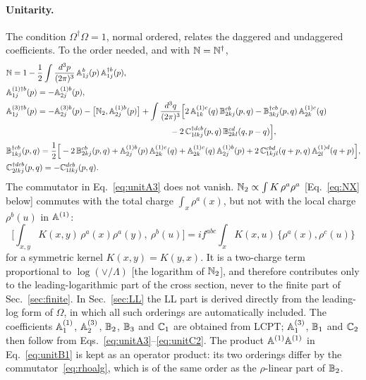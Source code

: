 \paragraph*{Unitarity.} The condition $\Omega^\dagger\Omega=1$, normal ordered, relates the daggered and undaggered coefficients. To the order needed, and with $\mathbb{N}=\mathbb{N}^\dagger$,
\begin{align}
&\mf N=1-\frac12\int\frac{d^3p}{(2\pi)^3}\,\mf A^{b}_{1j}(p)\,\mf A^{\dagger b}_{1j}(p),\label{eq:unitN}\\
&\mf A^{(1)\dagger b}_{1j}(p)=-\mf A^{(1)b}_{2j}(p),\label{eq:unitA1}\\
&\mf A^{(3)\dagger b}_{1j}(p)=-\mf A^{(3)b}_{2j}(p)-\big[\mf N_2,\mf A^{(1)b}_{2j}(p)\big]+\int\frac{d^3q}{(2\pi)^3}\Big[2\,\mf A^{(1)c}_{1k}(q)\,\mf B^{cb}_{2kj}(p,q)-\mf B^{\dagger cb}_{3kj}(p,q)\,\mf A^{(1)c}_{2k}(q)\notag\\
&\hspace{20em}-2\,\mf C^{\dagger dcb}_{1lkj}(p,q)\,\mf B^{cd}_{2kl}(q,p-q)\Big],\label{eq:unitA3}\\
&\mf B^{\dagger cb}_{1kj}(p,q)=\frac12\Big[-2\,\mf B^{cb}_{2kj}(p,q)+\mf A^{(1)b}_{2j}(p)\,\mf A^{(1)c}_{2k}(q)+\mf A^{(1)c}_{2k}(q)\,\mf A^{(1)b}_{2j}(p)+2\,\mf C^{cbd}_{1kjl}(q+p,q)\,\mf A^{(1)d}_{2l}(q+p)\Big],\label{eq:unitB1}\\
&\mf C^{\dagger dcb}_{2lkj}(p,q)=-\mf C^{dcb}_{1lkj}(p,q).\label{eq:unitC2}
\end{align}
The commutator in Eq.~\eqref{eq:unitA3} does not vanish. $\mathbb{N}_2\propto\int K\,\rho^a\rho^a$ [Eq.~\eqref{eq:NX} below] commutes with the total charge $\int_x\rho^a(x)$, but not with the local charge $\rho^b(u)$ in $\mathbb{A}^{(1)}$:
\begin{equation}
\Big[\int_{x,y}K(x,y)\,\rho^a(x)\rho^a(y),\ \rho^b(u)\Big]=if^{abc}\int_xK(x,u)\,\big\{\rho^a(x),\rho^c(u)\big\}
\label{eq:Ncomm}
\end{equation}
for a symmetric kernel $K(x,y)=K(y,x)$. It is a two-charge term proportional to $\log(\vee/\Lambda)$ [the logarithm of $\mathbb{N}_2$], and therefore contributes only to the leading-logarithmic part of the cross section, never to the finite part of Sec.~\ref{sec:finite}. In Sec.~\ref{sec:LL} the LL part is derived directly from the leading-log form of $\Omega$, in which all such orderings are automatically included.
The coefficients $\mathbb{A}^{(1)}_1$, $\mathbb{A}^{(3)}_2$, $\mathbb{B}_2$, $\mathbb{B}_3$ and $\mathbb{C}_1$ are obtained from LCPT; $\mathbb{A}^{(3)}_1$, $\mathbb{B}_1$ and $\mathbb{C}_2$ then follow from Eqs.~\eqref{eq:unitA3}--\eqref{eq:unitC2}. The product $\mathbb{A}^{(1)}\mathbb{A}^{(1)}$ in Eq.~\eqref{eq:unitB1} is kept as an operator product: its two orderings differ by the commutator~\eqref{eq:rhoalg}, which is of the same order as the $\rho$-linear part of $\mathbb{B}_2$.

